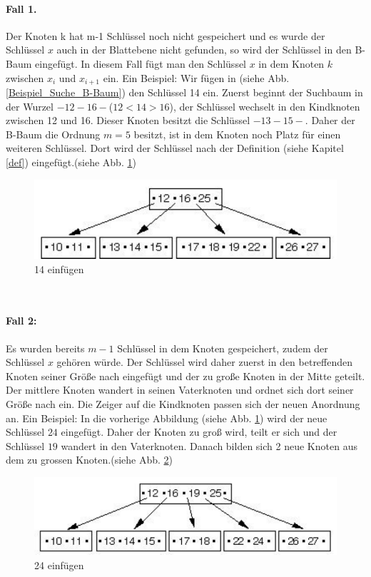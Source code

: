 \paragraph{Fall 1.}
Der Knoten k hat m-1 Schl\"ussel noch nicht gespeichert und es wurde der Schl\"ussel $x$ auch in der Blattebene nicht gefunden, so wird der Schl\"ussel in den B-Baum eingef\"ugt. In diesem Fall f\"ugt man den Schl\"ussel $x$ in dem Knoten $k$ zwischen $x_{i}$ und $ x_{i+1} $ ein.
\newline
Ein Beispiel:
\newline
Wir f\"ugen in (siehe Abb. \ref{Beispiel_Suche_B-Baum})  den Schl\"ussel 14 ein. Zuerst beginnt der Suchbaum in der Wurzel $-12-16-$($12<14>16$), der Schl\"ussel wechselt in den Kindknoten zwischen 12 und 16. Dieser Knoten besitzt die Schl\"ussel $-13-15-$. Daher der B-Baum die Ordnung $m=5$ besitzt, ist in dem Knoten noch Platz f\"ur einen weiteren Schl\"ussel. Dort wird der Schl\"ussel nach der Definition (siehe Kapitel \ref{def}) eingef\"ugt.(siehe Abb. \ref{insert_01}) 
\\[0.5in]
\begin{figure}[h!] %
\centering
\includegraphics[width=0.7\linewidth]{images/insert_01}
\caption{14 einf\"ugen}
\label{insert_01}
\end{figure}
\\[0.3in]
\paragraph{Fall 2:}
Es wurden bereits $m-1$ Schl\"ussel in dem Knoten gespeichert, zudem der Schl\"ussel $x$ geh\"oren w\"urde. Der Schl\"ussel wird daher zuerst in den betreffenden Knoten seiner Gr\"o\ss{}e nach eingef\"ugt und der zu gro\ss{}e Knoten in der Mitte geteilt. Der mittlere Knoten wandert in seinen Vaterknoten und ordnet sich dort seiner Gr\"o\ss{}e nach ein. Die Zeiger auf die Kindknoten passen sich der neuen Anordnung an.
\newline
Ein Beispiel:
\newline
In die vorherige Abbildung (siehe Abb. \ref{insert_01}) wird der neue Schl\"ussel $24$ eingef\"ugt. Daher der Knoten zu gro\ss{} wird, teilt er sich und der Schl\"ussel $19$ wandert in den Vaterknoten. Danach bilden sich 2 neue Knoten aus dem zu gross{}en Knoten.(siehe Abb. \ref{insert_02})
\\[0.5in]
\begin{figure}[h!] %
	\centering
	\includegraphics[width=0.7\linewidth]{images/insert_02}
	\caption{24 einf\"ugen}
	\label{insert_02}
\end{figure}
\newpage
